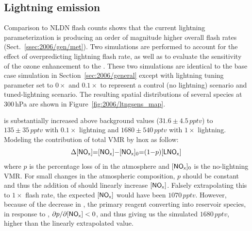\subsection{Lightning emission}\label{ssec:2006/sens/lnox}

Comparison to NLDN flash counts shows that the current lightning parameterization is producing an order of magnitude higher overall flash rates
(Sect.~\ref{ssec:2006/gen/met}). Two simulations are performed to account for the effect of overpredicting lightning flash rate, as well as to evaluate
the sensitivity of the ozone enhancement to the {\lnox}. These two simulations are identical to the base case simulation in Section~\ref{sec:2006/general}
except with lightning tuning parameter set to $0\times$ and $0.1\times$ to represent a control (no lightning) scenario and tuned-lightning scenario. The
resulting spatial distributions of several species at 300\,\unit{hPa} are shown in Figure~\ref{fig:2006/ltngsens_map}.


 is substantially increased above background values ($31.6\pm4.5\,\unit{pptv}$) to $135\pm35\,\unit{pptv}$ with $0.1\times$ lightning and
$1680\pm540\,\unit{pptv}$ with $1\times$ lightning. Modeling the contribution of total  VMR by {lnox} as follow:
\begin{equation}\label{eqn:nox+lnox}
	\Delta[\chem{NO_x}] = [\chem{NO_x}]-[\chem{NO_x}]_0 = (1-p)[\chem{LNO_x}]
\end{equation}
where $p$ is the percentage loss of {\lnox} in the atmosphere and $[\chem{NO_x}]_0$ is the no-lightning  VMR. For small changes in the
atmospheric composition, $p$ should be constant and thus the addition of \lnox should linearly increase $[\chem{NO_x}]$. Falsely extrapolating this
to $1\times$ flash rate, the expected $[\chem{NO_x}]$ would have been $1070\,\unit{pptv}$. However, because of the decrease in , the
primary reagent converting  into reservoir species, in response to {\lnox}, $\partial p/\partial [\chem{NO_x}] < 0$, and thus giving us the
simulated $1680\,\unit{pptv}$, higher than the linearly extrapolated value.

